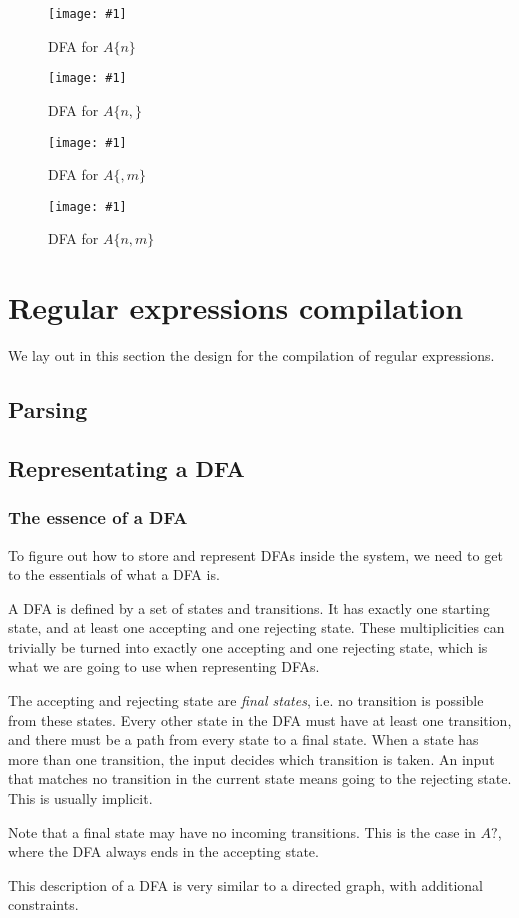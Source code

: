 \documentclass[11pt,a4paper]{report}
\newcommand{\regexp}[1]{$#1$}
\newcommand{\insertfa}[3]{
\begin{figure}[h!]
	\centering
	\texttt{[image: \#1]}
	\caption{#2}
\end{figure}
}
\newcommand{\smalldfa}[2]{\insertfa{./img/dfa/#1.png}{DFA for #2}{scale=0.7}}
\newcommand{\largedfa}[2]{\insertfa{./img/dfa/#1.png}{DFA for #2}{width=\textwidth}}
\begin{document}
\smalldfa{repeat-n-times}{\regexp{A\{n\}}}

\smalldfa{repeat-at-least-n-times}{\regexp{A\{n,\}}}

\smalldfa{repeat-at-most-m-times}{\regexp{A\{,m\}}}

\largedfa{repeat-between-n-and-m-times}{\regexp{A\{n,m\}}}

\chapter{Regular expressions compilation}

We lay out in this section the design for the compilation of regular expressions.

\section{Parsing}

\section{Representating a DFA}

\subsection{The essence of a DFA}

To figure out how to store and represent DFAs inside the system, we need to get to the essentials of what a DFA is.

A DFA is defined by a set of states and transitions. It has exactly one starting state, and at least one accepting and one rejecting state. These multiplicities can trivially be turned into exactly one accepting and one rejecting state, which is what we are going to use when representing DFAs.

The accepting and rejecting state are \textit{final states}, i.e. no transition is possible from these states. Every other state in the DFA must have at least one transition, and there must be a path from every state to a final state. When a state has more than one transition, the input decides which transition is taken. An input that matches no transition in the current state means going to the rejecting state. This is usually implicit.

Note that a final state may have no incoming transitions. This is the case in \regexp{A?}, where the DFA always ends in the accepting state.

This description of a DFA is very similar to a directed graph, with additional constraints.
\end{document}
